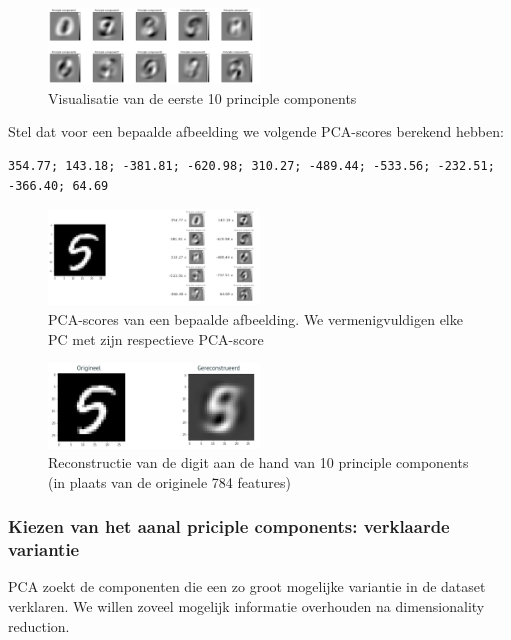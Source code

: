 \documentclass{article}
\begin{document}
\begin{figure}[H]
    \centering
    \includegraphics[width=0.5\textwidth]{mnist-pca.png}
    \caption{Visualisatie van de eerste 10 principle components}
\end{figure}

Stel dat voor een bepaalde afbeelding we volgende PCA-scores berekend hebben:

\begin{verbatim}
354.77; 143.18; -381.81; -620.98; 310.27; -489.44; -533.56; -232.51; -366.40; 64.69
\end{verbatim}

\begin{figure}[H]
    \centering
    \includegraphics[width=0.5\textwidth]{mnist-pca2.png}
    \caption{PCA-scores van een bepaalde afbeelding. We vermenigvuldigen elke PC met zijn respectieve PCA-score}
\end{figure}

\begin{figure}[H]
    \centering
    \includegraphics[width=0.5\textwidth]{mnist-pca3.png}
    \caption{Reconstructie van de digit aan de hand van 10 principle components (in plaats van de originele 784 features)}
\end{figure}

\subsubsection{Kiezen van het aanal priciple components: verklaarde variantie}

PCA zoekt de componenten die een zo groot mogelijke variantie in de dataset verklaren. 
We willen zoveel mogelijk informatie overhouden na dimensionality reduction.
\end{document}
